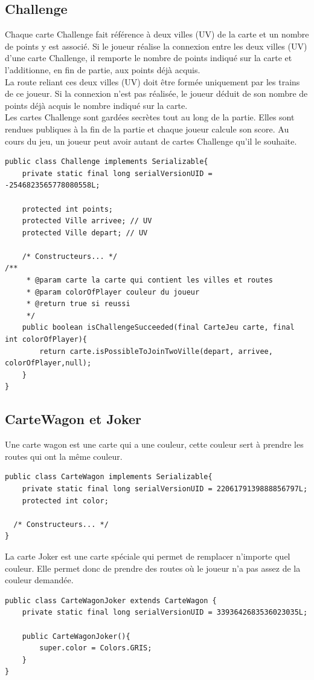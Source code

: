 \documentclass{report}
\begin{document}
\subsection{Challenge} \label{defChallenge}
Chaque carte Challenge fait référence à deux villes (UV) de la carte et un nombre de points y est associé. Si le joueur réalise la connexion entre les deux villes (UV) d’une carte Challenge, il remporte le nombre de points indiqué sur la carte et l’additionne, en fin de partie, aux points déjà acquis.\\
La route reliant ces deux villes (UV) doit être formée uniquement par les trains de ce joueur. Si la connexion n’est pas réalisée, le joueur déduit de son nombre de points déjà acquis le nombre indiqué sur la carte.\\
Les cartes Challenge sont gardées secrètes tout au long de la partie. Elles sont rendues publiques à la fin de la partie et chaque joueur calcule son score. Au cours du jeu, un joueur peut avoir autant de cartes Challenge qu’il le souhaite.
\begin{lstlisting}[caption=Représentation d'un challenge]
public class Challenge implements Serializable{
	private static final long serialVersionUID = -2546823565778080558L;

	protected int points;
	protected Ville arrivee; // UV
	protected Ville depart; // UV
	
	/* Constructeurs... */
/**
	 * @param carte la carte qui contient les villes et routes
	 * @param colorOfPlayer couleur du joueur
	 * @return true si reussi
	 */
	public boolean isChallengeSucceeded(final CarteJeu carte, final int colorOfPlayer){
		return carte.isPossibleToJoinTwoVille(depart, arrivee, colorOfPlayer,null);
	}
}
\end{lstlisting}
\subsection{CarteWagon et Joker} \label{defCarteWagon}
Une carte wagon est une carte qui a une couleur, cette couleur sert à prendre les routes qui ont la même couleur.
\begin{lstlisting}[caption=Représentation d'une carte]
public class CarteWagon implements Serializable{
	private static final long serialVersionUID = 2206179139888856797L;
	protected int color;

  /* Constructeurs... */
}
\end{lstlisting}


La carte Joker est une carte spéciale qui permet de remplacer n'importe quel couleur. Elle permet donc de prendre des routes où le joueur n'a pas assez de la couleur demandée.%
\begin{lstlisting}[caption=Représentation d'une carte Joker]
public class CarteWagonJoker extends CarteWagon {
	private static final long serialVersionUID = 3393642683536023035L;

	public CarteWagonJoker(){
		super.color = Colors.GRIS;
	}
}
\end{lstlisting}
\end{document}
